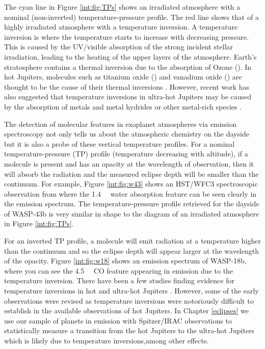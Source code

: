 The cyan line in Figure \ref{int:fig:TPs} shows an irradiated atmosphere with a nominal (non-inverted) temperature-pressure profile. The red line shows that of a highly irradiated atmosphere with a temperature inversion. A temperature inversion is where the temperature starts to increase with decreasing pressure. This is caused by the UV/visible absorption of the strong incident stellar irradiation, leading to the heating of the upper layers of the atmosphere. Earth's stratosphere contains a thermal inversion due to the absorption of Ozone (). In hot Jupiters, molecules such as titanium oxide () and vanadium oxide () are thought to be the cause of their thermal inversions \citep{Hubeny2003, Fortney2008, Desert2008}. However, recent work has also suggested that temperature inversions in ultra-hot Jupiters may be caused by the absorption of metals and metal hydrides \citep[Fe, Mg, SiO][]{Lothringer2018} or other metal-rich species \citep[AlO, CaO, NaH and MgH][]{Gandhi2019}.

The detection of molecular features in exoplanet atmospheres via emission spectroscopy not only tells us about the atmospheric chemistry on the dayside but it is also a probe of these vertical temperature profiles. For a nominal temperature-pressure (TP) profile (temperature decreasing with altitude), if a molecule is present and has an opacity at the wavelength of observation, then it will absorb the radiation and the measured eclipse depth will be smaller than the continuum. For example, Figure \ref{int:fig:w43} shows an HST/WFC3 spectroscopic observation from \citet{Stevenson2014c} where the 1.4~\um~ water absorption feature can be seen clearly in the emission spectrum. The temperature-pressure profile retrieved for the dayside of WASP-43b is very similar in shape to the diagram of an irradiated atmosphere in Figure \ref{int:fig:TPs}.

For an inverted TP profile, a molecule will emit radiation at a temperature higher than the continuum and so the eclipse depth will appear larger at the wavelength of the opacity. Figure \ref{int:fig:w18} shows an emission spectrum of WASP-18b, where you can see the 4.5~\um~ CO feature appearing in emission due to the temperature inversion. There have been a few studies finding evidence for temperature inversions in hot and ultra-hot Jupiters \citep[e.g.,][]{Knutson2008,Knutson2009b,Madhusudhan2010,Haynes2015,Evans2017,Arcangeli2018}. However, some of the early observations were revised \citep[e.g.,][]{Diamond-Lowe2014} as temperature inversions were notoriously difficult to establish in the available observations of hot Jupiters. In Chapter \ref{eclipses} we use our sample of planets in emission with Spitzer/IRAC observations to statistically measure a transition from the hot Jupiters to the ultra-hot Jupiters which is likely due to temperature inversions,among other effects.

